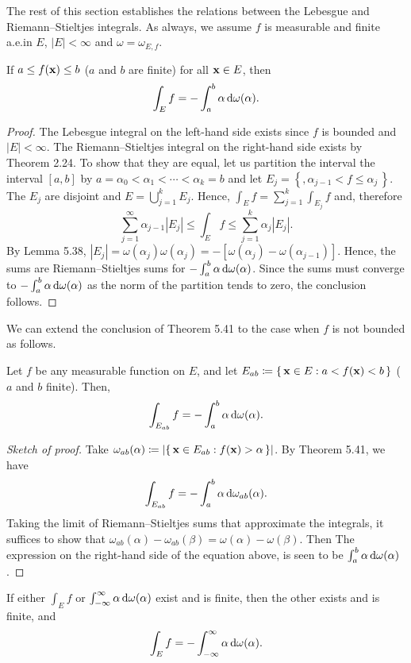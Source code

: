 The rest of this section establishes the relations between the Lebesgue and
Riemann--Stieltjes integrals. As always, we assume $f$ is measurable and
finite a.e.\@ in $E$, $|E|<\infty$ and $\omega=\omega_{E,f}$.

\begin{theorem}[5.41]
If $a\leq f(\mathbf{x})\leq b$ ($a$ and $b$ are finite) for all $\mathbf{x}\in E$, then
\[
\int_E f=-\int_a^b\alpha\mathop{}\!\mathrm{d}\omega(\alpha).
\]
\end{theorem}
\begin{proof}
The Lebesgue integral on the left-hand side exists since $f$ is bounded and
$|E|<\infty$. The Riemann--Stieltjes integral on the right-hand side exists
by Theorem 2.24. To show that they are equal, let us partition the interval
the interval $[a,b]$ by $a=\alpha_0<\alpha_1<\dotsb<\alpha_k=b$ and let
$E_j=\left\{,\alpha_{j-1}<f\leq\alpha_j\,\right\}$. The $E_j$ are disjoint
and $E=\bigcup_{j=1}^k E_j$. Hence, $\int_E f=\sum_{j=1}^k\int_{E_j}f$ and,
therefore
\[
\sum_{j=1}^\infty \alpha_{j-1}|E_j|\leq\int_E f\leq\sum_{j=1}^k\alpha_j|E_j|.
\]
By Lemma 5.38,
$|E_j|=\omega(\alpha_j)\omega(\alpha_j)=-[\omega(\alpha_j)-\omega(\alpha_{j-1})]$. Hence,
the sums are Riemann--Stieltjes sums for
$-\int_a^b\alpha\mathop{}\!\mathrm{d}\omega(\alpha)$. Since the sums must converge to
$-\int_a^b\alpha\mathop{}\!\mathrm{d}\omega(\alpha)$ as the norm of the partition tends to
zero, the conclusion follows.
\end{proof}

We can extend the conclusion of Theorem 5.41 to the case when $f$ is not
bounded as follows.
\begin{theorem}[5.42]
Let $f$ be any measurable function on $E$, and let
$E_{ab}\coloneqq\left\{\,\mathbf{x}\in E:a<f(\mathbf{x})<b\,\right\}$ ($a$ and $b$
finite). Then,
\[
\int_{E_{ab}}f=-\int_a^b\alpha\mathop{}\!\mathrm{d}\omega(\alpha).
\]
\end{theorem}
\begin{proof}[Sketch of proof]
Take $\omega_{ab}(\alpha)\coloneqq\left|\left\{\,\mathbf{x}\in
    E_{ab}:f(\mathbf{x})>\alpha\,\right\}\right|$. By Theorem 5.41, we have
\[
\int_{E_{ab}}f=-\int_a^b\alpha\mathop{}\!\mathrm{d}\omega_{ab}(\alpha).
\]
Taking the limit of Riemann--Stieltjes sums that approximate the integrals,
it suffices to show that
$\omega_{ab}(\alpha)-\omega_{ab}(\beta)=\omega(\alpha)-\omega(\beta)$. Then
The expression on the right-hand side of the equation above, is seen to be
$\int_a^b\alpha\mathop{}\!\mathrm{d}\omega(\alpha)$.
\end{proof}

\begin{theorem}[5.43]
If either $\int_E f$ or $\int_{-\infty}^\infty\alpha\mathop{}\!\mathrm{d}\omega(\alpha)$
exist and is finite, then the other exists and is finite, and
\[
\int_E f=-\int_{-\infty}^\infty\alpha\mathop{}\!\mathrm{d}\omega(\alpha).
\]
\end{theorem}

